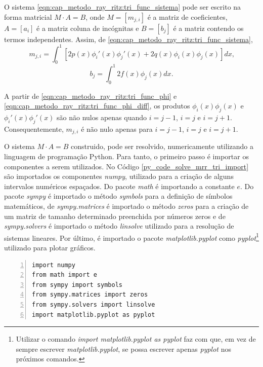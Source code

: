 \documentclass[
	12pt,				%
	openright,			%
    twoside,			%
	a4paper,			%
	english,			%
	french,				%
	spanish,			%
	brazil				%
	]{abntex2}
\numberwithin{lema}{chapter}
\numberwithin{teorema}{chapter}
\numberwithin{definicao}{chapter}
\numberwithin{exemplo}{chapter}
\numberwithin{figure}{chapter}
\begin{document}
O sistema \eqref{eqn:cap_metodo_ray_ritz:tri_func_sistema} pode ser escrito na forma matricial $M\cdot A=B$, onde $M=[m_{j, i}]$ é a matriz de coeficientes, $A=[a_i]$ é a matriz coluna de incógnitas e $B=[b_j]$ é a matriz contendo os termos independentes. Assim, de \eqref{eqn:cap_metodo_ray_ritz:tri_func_sistema},
\begin{equation}
	\label{eqn:cap_metodo_ray_ritz:tri_func_mji}
	m_{j,i}=\int_{0}^{1} \left [
		2p(x)\phi_i'(x)\phi_j'(x)
		+
		2q(x)\phi_i(x)\phi_j(x)
	\right ]dx
	\text{,}
\end{equation}
\begin{equation}
	\label{eqn:cap_metodo_ray_ritz:tri_func_bj}
	b_j=\int_{0}^{1} 2f(x)\phi_j(x)dx
	\text{.}
\end{equation}

A partir de \eqref{eqn:cap_metodo_ray_ritz:tri_func_phi} e \eqref{eqn:cap_metodo_ray_ritz:tri_func_phi_diff}, os produtos $\phi_i(x)\phi_j(x)$ e $\phi_i'(x)\phi_j'(x)$ são não nulos apenas quando $i=j-1$, $i=j$ e $i=j+1$. Consequentemente, $m_{j,i}$ é não nulo apenas para $i=j-1$, $i=j$ e $i=j+1$.

O sistema $M\cdot A=B$ construido, pode ser resolvido, numericamente utilizando a linguagem de programação Python. Para tanto, o primeiro passo é importar os componentes a serem utilizados. No Código \ref{py_code_solve_mrr_tri_import} são importados os componentes \textit{numpy}, utilizado para a criação de alguns intervalos numéricos espaçados. Do pacote \textit{math} é importando a constante $e$. Do pacote \textit{sympy} é importado o método \textit{symbols} para a definição de símbolos matemáticos, de \textit{sympy.matrices} é importado o método \textit{zeros} para a criação de um matriz de tamanho determinado preenchida por números zeros e de \textit{sympy.solvers} é importado o método \textit{linsolve} utilizado para a resolução de sistemas lineares. Por último, é importado o pacote \textit{matplotlib.pyplot} como \textit{pyplot}\footnote{Utilizar o comando \textit{import matplotlib.pyplot as pyplot} faz com que, em vez de sempre escrever \textit{matplotlib.pyplot}, se possa escrever apenas \textit{pyplot} nos próximos comandos.} utilizado para plotar gráficos.

\begin{lstlisting}[style=Python, xleftmargin=2em, numbers=left, firstnumber=1, caption={Importação dos Pacotes Utilizados para a Resolução}, captionpos=t, label=py_code_solve_mrr_tri_import]
import numpy
from math import e
from sympy import symbols
from sympy.matrices import zeros
from sympy.solvers import linsolve
import matplotlib.pyplot as pyplot
\end{lstlisting}
\end{document}
